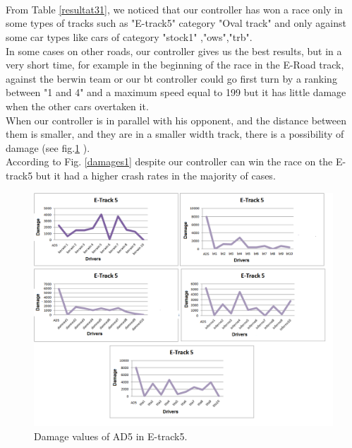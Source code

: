 \documentclass{llncs}
\begin{document}
\paragraph{\\}	
From Table \ref {resultat31}, we noticed that our controller has won a race only in some types of tracks such as "E-track5" category "Oval track" and only against some car types like cars of category "stock1" ,"ows","trb".
\\

In some cases on other roads, our controller gives us the best results, but in a very short time, for example in the beginning of the race in the E-Road track, against the berwin team or our bt controller could go first turn by a ranking between "1 and 4" and a maximum speed equal to 199 but it has little damage when the other cars overtaken it.
\\

When our controller is in parallel with his opponent, and the distance between them is smaller, and they are in a smaller width track,  there is a possibility of  damage (see fig.\ref{damages} ).
\\

According to Fig. \ref{damages1}  despite our controller can win the race on the E-track5 but it had a higher crash rates in the majority of cases.

\newpage
\begin{figure}[h!]
	
	\centering
	\includegraphics[width=1\textwidth]{fig/damageRace.png}
	\begin{minipage}{10cm}
		\centering
		\caption{\footnotesize Damage values of AD5 in E-track5.}
		\label{damages}
	\end{minipage} 
\end{figure}
\end{document}
